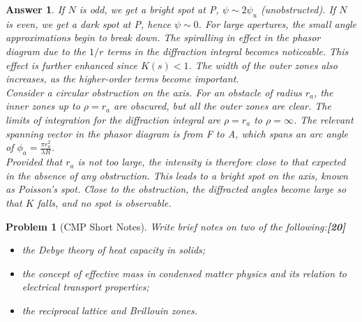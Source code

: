 \documentclass[a4paper]{article}
\newtheorem{ans}{Answer}[subsection]
\theoremstyle{new}
\newtheorem{qns}{Problem}[subsection]
\begin{document}
\begin{ans}
If $N$ is odd, we get a bright spot at P, $\psi\sim2\psi_u$ (unobstructed). If $N$ is even, we get a dark spot at P, hence $\psi\sim 0$. For large apertures, the small angle approximations begin to break down. The spiralling in effect in the phasor diagram due to the $1/r$ terms in the diffraction integral becomes noticeable. This effect is further enhanced since $K(s)<1$. The width of the outer zones also increases, as the higher-order terms become important.\\[5pt]
Consider a circular obstruction on the axis. For an obstacle of radius $r_a$, the inner zones up to $\rho=r_a$ are obscured, but all the outer zones are clear. The limits of integration for the diffraction integral are $\rho=r_a$ to $\rho=\infty$. The relevant spanning vector in the phasor diagram is from F to A, which spans an arc angle of $\phi_a=\frac{\pi r_a^2}{\lambda R}$.\\[5pt]
Provided that $r_a$ is not too large, the intensity is therefore close to that expected in the absence of any obstruction. This leads to a bright spot on the axis, known as Poisson's spot. Close to the obstruction, the diffracted angles become large so that $K$ falls, and no spot is observable.
\end{ans}
\newpage
\begin{qns}[CMP Short Notes]
Write brief notes on two of the following:\hfill\textbf{[20]}
\begin{itemize}
    \item the Debye theory of heat capacity in solids;
    \item the concept of effective mass in condensed matter physics and its relation to electrical transport properties;
    \item the reciprocal lattice and Brillouin zones.
\end{itemize}
\end{qns}
\end{document}
